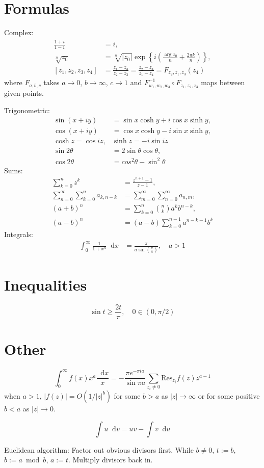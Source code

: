 \documentclass[10pt]{article}
\newcommand\dif{\mathop{}\!\mathrm{d}}
\newcommand{\Res}{\mathrm{Res}}
\begin{document}
\section{Formulas}
Complex:
\begin{align*}
   \frac{1 + i}
        {1 - i}
&= i, \\
   \sqrt[n]{z_0}
&= \sqrt[n]{|z_0|}
   \exp
   \left\{
     i
     \left(
       \frac{\arg z_0}{n}
     + \frac{2 \pi k}{n}
     \right)
   \right\}, \\
   [z_1, z_2, z_3, z_4]
&= \frac{z_1 - z_3}
        {z_2 - z_3}
 = \frac{z_2 - z_4}
        {z_1 - z_4}
 = F_{z_2, z_1, z_3}(z_4)
\end{align*}
where $F_{a,b,c}$ takes $a \to 0$, $b \to \infty$, $c \to 1$ and
$F_{w_1, w_2, w_3}^{-1} \circ F_{z_1, z_2, z_3}$ maps between given points.

Trigonometric:
\begin{align*}
   \sin (x + i y)
&= \sin x \cosh y
 + i \cos x \sinh y, \\
   \cos (x + i y)
&= \cos x \cosh y
 - i \sin x \sinh y, \\
  \cosh z = \cos iz,
& \sinh z = -i \sin iz \\
   \sin 2\theta
&= 2\sin \theta \cos \theta, \\
   \cos 2\theta
&= cos^2\theta - \sin^2\theta
\end{align*}
Sums:
\begin{align*}
   \sum_{k=0}^n
     z^k
&= \frac{z^{n+1} - 1}
        {z - 1}, \\
   \sum_{n=0}^\infty
     \sum_{k=0}^n
       a_{k,n-k}
&= \sum_{m=0}^\infty
     \sum_{n=0}^\infty
       a_{n,m}, \\
   (a + b)^n
&= \sum_{k=0}^n
     {n \choose k}
     a^k b^{n-k}, \\
   (a - b)^n
&= (a - b)
   \sum_{k=0}^{n-1}
     a^{n-k-1} b^k
\end{align*}
Integrals:
\begin{align*}
   \int_0^\infty
     \frac{1}{1 + x^a}
     \dif x
&= \frac{\pi}
        {a \sin \left(\frac{\pi}{a}\right)}, \quad a > 1
\end{align*}

\section{Inequalities}
$$
\sin t \geq \frac{2t}{\pi}, \quad 0 \in (0, \pi / 2)
$$

\section{Other}
$$
  \int_0^\infty f(x) x^a \frac{\dif x}{x}
= -\frac{\pi e^{-\pi i a}}{\sin \pi a}
  \sum_{z_i \neq 0} \Res_{z_i} f(z) z^{a-1}
$$
when $a > 1$, $|f(z)| = O(1 / |z|^b)$ for some $b > a$ as $|z| \to \infty$
or for some positive $b < a$ as $|z| \to 0$.

$$
\int u \dif v = uv - \int v \dif u
$$

Euclidean algorithm: Factor out obvious divisors first.
While $b \neq 0$, $t := b$, $b := a \bmod b$, $a := t$.
Multiply divisors back in.
\end{document}
